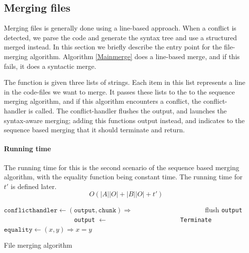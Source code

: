 \documentclass[11pt]{article}
\begin{document}
\subsection{Merging files}
\label{MergingFiles}
Merging files is generally done using a line-based approach. When a conflict is detected, we parse the code and generate the syntax tree and use a structured merged instead. In this section we briefly describe the entry point for the file-merging algorithm. Algorithm \ref{Mainmerge} does a line-based merge, and if this fails, it does a syntactic merge.

The function is given three lists of strings. Each item in this list represents a line in the code-files we want to merge. It passes these lists to the to the sequence merging algorithm, and if this algorithm encounters a conflict, the conflict-handler is called. The conflict-handler flushes the output, and launches the syntax-aware merging; adding this functions output instead, and indicates to the sequence based merging that it should terminate and return.

\paragraph{Running time} The running time for this is the second scenario of the sequence based merging algorithm, with the equality function being constant time. The running time for $t'$ is defined later. 
		\begin{equation}
			O(|A||O| + |B||O| + t') \nonumber
		\end{equation}


\begin{algorithm}
\begin{algorithmic}
   \State $\texttt{conflicthandler} \gets (\texttt{output}, \texttt{chunk}) \Rightarrow$
      \State ~~~~~~~~~~~~~~~~~~~~ flush \texttt{output}
      \State ~~~~~~~~~~~~~~~~~~~~ \texttt{output} $\gets$ 
      \State ~~~~~~~~~~~~~~~~~~~~ \Return \texttt{Terminate} 
	\State $\texttt{equality} \gets (x, y) \Rightarrow x = y$
	\State \Return {}
\EndFunction
\end{algorithmic}
\caption{File merging algorithm}
  \label{Mainmerge}
\end{algorithm}
\end{document}
